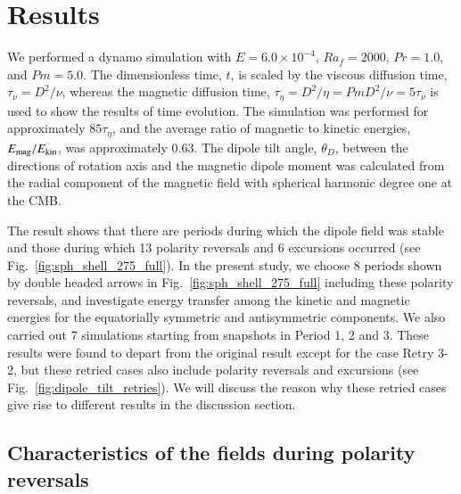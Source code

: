 \section{Results}
\label{section:results}

We performed a dynamo simulation with $E = 6.0 \times 10^{-4}$, $Ra_f = 2000$, $Pr = 1.0$, and $Pm = 5.0$. 
The dimensionless time, $t$, is scaled by the viscous diffusion time, $\tau_\nu = D^2 / \nu$, whereas the magnetic diffusion time, $\tau_\eta = D^2 / \eta = Pm D^2 / \nu = 5 \tau_\nu$ is used to show the results of time evolution.
The simulation was performed for approximately $85 \tau_\eta$, and the average ratio of magnetic to kinetic energies, $E_{\rm mag} / E_{\rm kin}$, was approximately 0.63. 
The dipole tilt angle, $\theta_D$, between the directions of rotation axis and the magnetic dipole moment was calculated from the radial component of the magnetic field with spherical harmonic degree one  at the CMB.




The result shows that there are periods during which the dipole field was stable and those during which 13 polarity reversals and 6 excursions occurred (see Fig.~\ref{fig:sph_shell_275_full}).
In the present study, we choose 8 periods shown by double headed arrows in Fig.~\ref{fig:sph_shell_275_full} including these polarity reversals, and investigate energy transfer among the kinetic and magnetic energies for the equatorially symmetric and antisymmetric components. 
We also carried out 7 simulations starting from snapshots in Period 1, 2 and 3. 
These results were found to depart from the original result except for the case Retry 3-2, but these retried cases also include polarity reversals and excursions (see Fig.~\ref{fig:dipole_tilt_retries}). 
We will discuss the reason why these retried cases give rise to different results in the discussion section.

\subsection{Characteristics of the fields during polarity reversals}

